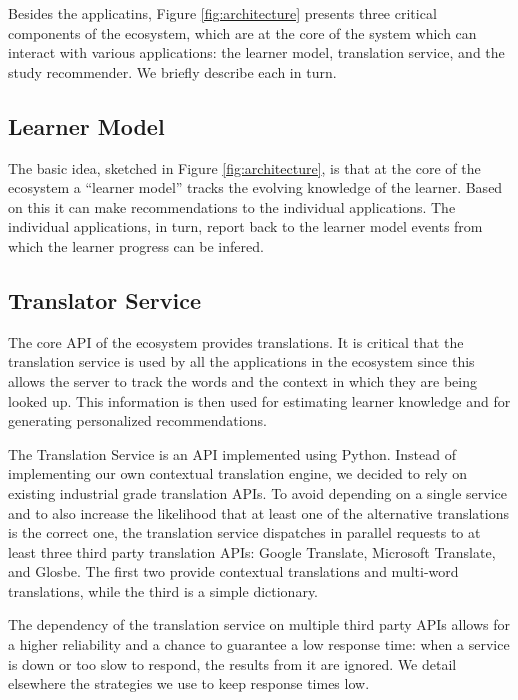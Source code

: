\begin{added}

	Besides the applicatins, Figure \ref{fig:architecture} presents three critical components of the ecosystem, which are at the core of the system which can interact with various applications: the learner model, translation service, and the study recommender. We briefly describe each in turn. 
	
\end{added}

\subsection{Learner Model}

The basic idea, sketched in Figure \ref{fig:architecture}, is that at the core of the ecosystem a ``learner model'' tracks the evolving knowledge of the learner. Based on this it can make recommendations to the individual applications. The individual applications, in turn, report back to the learner model events from which the learner progress can be infered. 


\subsection{Translator Service}

The core API of the ecosystem provides translations. It is critical that the translation service is used by all the applications in the ecosystem since this allows the server to track the words and the context in which they are being looked up. This information is then used for estimating learner knowledge and for generating personalized recommendations. 

The Translation Service is an API implemented using Python. Instead of implementing our own contextual translation engine, we decided to rely on existing industrial grade translation APIs. To avoid depending on a single service and to also increase the likelihood that at least one of the alternative translations is the correct one, the translation service dispatches in parallel requests to at least three third party translation APIs: Google Translate, Microsoft Translate, and Glosbe. \cite{Jager17-mux} The first two provide contextual translations and multi-word translations, while the third is a simple dictionary. 

The dependency of the translation service on multiple third party APIs allows for a higher reliability and a chance to guarantee a low response time: when a service is down or too slow to respond, the results from it are ignored. We detail elsewhere the strategies we use to keep response times low\cite{Jager17-mux}.

